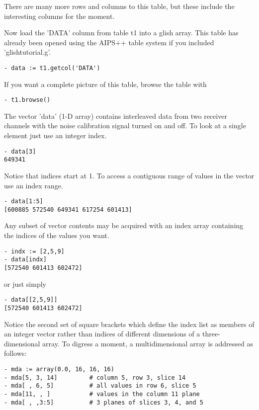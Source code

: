 There are many more rows and columns to this table, but these include the
interesting columns for the moment.

Now load the 'DATA' column from table t1 into a glish array.  This table has
already been opened using the AIPS++ table system if
you included 'glishtutorial.g'.

\begin{verbatim}
- data := t1.getcol('DATA')
\end{verbatim}

If you want a complete picture of this table, browse the table with

\begin{verbatim}
- t1.browse()
\end{verbatim}

The vector 'data' (1-D array) contains interleaved data from two receiver 
channels with the noise calibration signal turned on and off.  To look at a 
single element just use an integer index.

\begin{verbatim}
- data[3]
649341 
\end{verbatim}

Notice that indices start at 1.  To access a contiguous range of values in
the vector use an index range.

\begin{verbatim}
- data[1:5]
[600885 572540 649341 617254 601413]
\end{verbatim}

Any subset of vector contents may be acquired with an index array containing
the indices of the values you want.

\begin{verbatim}
- indx := [2,5,9]
- data[indx]
[572540 601413 602472]
\end{verbatim}

or just simply

\begin{verbatim}
- data[[2,5,9]]
[572540 601413 602472]
\end{verbatim}

Notice the second set of square brackets which define the index list as
members of an integer vector rather than indices of different dimensions of
a three-dimensional array.  To digress a moment, a multidimensional array
is addressed as follows:

\begin{verbatim}
- mda := array(0.0, 16, 16, 16)
- mda[5, 3, 14]			# column 5, row 3, slice 14
- mda[ , 6, 5]			# all values in row 6, slice 5
- mda[11, , ]			# values in the column 11 plane
- mda[ , ,3:5]			# 3 planes of slices 3, 4, and 5
\end{verbatim}


